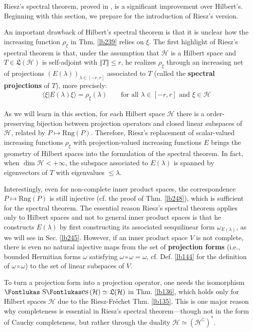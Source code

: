 \documentclass[12pt,b5paper,notitlepage]{article}
\theoremstyle{definition}
\theoremstyle{plain}
\DeclareMathOperator{\Ses}{\text{\Fontlukas S}\text{\kern -0pt {\Fontlukas\large es}}\,}
\newcommand{\fk}{\mathfrak}
\newcommand{\bk}[1]{\langle {#1}\rangle}
\newcommand{\Co}{\complement}
\newcommand{\Rng}{\mathrm{Rng}}
\newcommand{\MH}{\mathcal H}
\numberwithin{equation}{section}
\begin{document}
Riesz's spectral theorem, proved in \cite[Ch. V]{Rie13}, is a significant improvement over Hilbert's. Beginning with this section, we prepare for the introduction of Riesz's version.

An important drawback of Hilbert's spectral theorem is that it is unclear how the increasing function $\rho_\xi$ in Thm. \ref{lb239} relies on $\xi$. The first highlight of Riesz's spectral theorem is that, under the assumption that $\MH$ is a Hilbert space and $T\in\fk L(\MH)$ is self-adjoint with $\Vert T\Vert\leq r$, he realizes $\rho_\xi$ through an increasing net of projections $(E(\lambda))_{\lambda\in[-r,r]}$ associated to $T$ (called the \textbf{spectral projections} of $T$), more precisely:
\begin{align*}
\bk{\xi|E(\lambda)\xi}=\rho_\xi(\lambda)\qquad\text{for all }\lambda\in[-r,r]\text{ and }\xi\in\MH
\end{align*}

As we will learn in this section, for each Hilbert space $\MH$ there is a order-preserving bijection between projection operators and closed linear subspaces of $\MH$, related by $P\mapsto \Rng(P)$. Therefore, Riesz's replacement of scalar-valued increasing functions $\rho_\xi$ with projection-valued increasing functions $E$ brings the geometry of Hilbert spaces into the formulation of the spectral theorem. In fact, when $\dim \MH<+\infty$, the subspace associated to $E(\lambda)$ is spanned by eigenvectors of $T$ with eigenvalues $\leq\lambda$.


Interestingly, even for non-complete inner product spaces, the correspondence $P\mapsto\Rng(P)$ is still injective (cf. the proof of Thm. \ref{lb248}), which is sufficient for the spectral theorem. The essential reason Riesz's spectral theorem applies only to Hilbert spaces and not to general inner product spaces is that he constructs $E(\lambda)$ by first constructing its associated sesquilinear form $\omega_{E(\lambda)}$, as we will see in Sec. \ref{lb245}. However, if an inner product space $V$ is not complete, there is even no natural injective maps from the set of \textbf{projection forms}  (i.e., bounded Hermitian forms $\omega$ satisfying $\omega\circ\omega=\omega$, cf. Def. \ref{lb144} for the definition of $\omega\circ\omega$) to the set of linear subspaces of $V$. 

To turn a projection form into a projection operator, one needs the isomorphism $\Ses(\MH)\simeq\fk L(\MH)$ in Thm. \ref{lb136}, which holds only for Hilbert spaces $\MH$ due to the Riesz-Fr\'echet Thm. \ref{lb135}. This is one major reason why completeness is essential in Riesz's spectral theorem---though not in the form of Cauchy completeness, but rather through the duality $\MH\simeq(\MH^\Co)^*$. 
\end{document}
